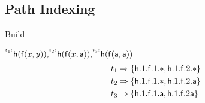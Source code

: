 \subsection{Path Indexing}


\begin{example}{Build}
	\def\TRIEWIDTH{4cm}
	\def\TEXTWIDTH{\textwidth-\TRIEWIDTH-2em}

	\begin{minipage}{\TEXTWIDTH}
		\(
		\TI{t_1}\,\mh(\mf(x,y)),
		\TI{t_2}\mh(\mf( x,\ma)),
		\TI{t_3}\mh(\mf(\ma,\ma))
		 \)
		\begin{align*}
		t_1 &\Rightarrow \{ \mh.1.\mf.1.{*},  \mh.1.\mf.2.{*} \} \\
		t_2 &\Rightarrow \{ \mh.1.\mf.1.{*},  \mh.1.\mf.2.\ma \} \\
		t_3 &\Rightarrow \{ \mh.1.\mf.1.\ma,  \mh.1.\mf.2 \ma \}
		\end{align*}
	\end{minipage}
%
	\begin{minipage}{\TRIEWIDTH}
	\begin{tikzpicture}[->,dotted]
%		


		\end{tikzpicture}
	\end{minipage}
\end{example}


